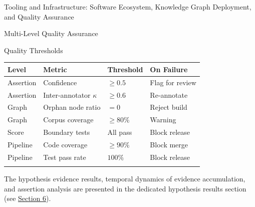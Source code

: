 \documentclass[
  ignorenonframetext,
]{beamer}
\newcounter{none} %
\begin{document}
\begin{frame}[fragile]{Tooling and Infrastructure: Software Ecosystem,
Knowledge Graph Deployment, and Quality Assurance \label{sec:tooling}}
\begin{block}{Multi-Level Quality Assurance}
\begin{block}{Quality Thresholds}
\protect{}\label{quality-thresholds}
{\def\LTcaptype{none} %
\begin{longtable}[]{@{}llll@{}}
\toprule\noalign{}
Level & Metric & Threshold & On Failure \\
\midrule\noalign{}
\endhead
Assertion & Confidence & \(\geq 0.5\) & Flag for review \\
Assertion & Inter-annotator \(\kappa\) & \(\geq 0.6\) & Re-annotate \\
Graph & Orphan node ratio & \(= 0\) & Reject build \\
Graph & Corpus coverage & \(\geq 80\%\) & Warning \\
Score & Boundary tests & All pass & Block release \\
Pipeline & Code coverage & \(\geq 90\%\) & Block merge \\
Pipeline & Test pass rate & \(100\%\) & Block release \\
\bottomrule\noalign{}
\end{longtable}
}

The hypothesis evidence results, temporal dynamics of evidence
accumulation, and assertion analysis are presented in the dedicated
hypothesis results section (see
\hyperref[sec:hypothesis_results]{Section 6}).
\end{block}
\end{block}
\end{frame}
\end{document}
